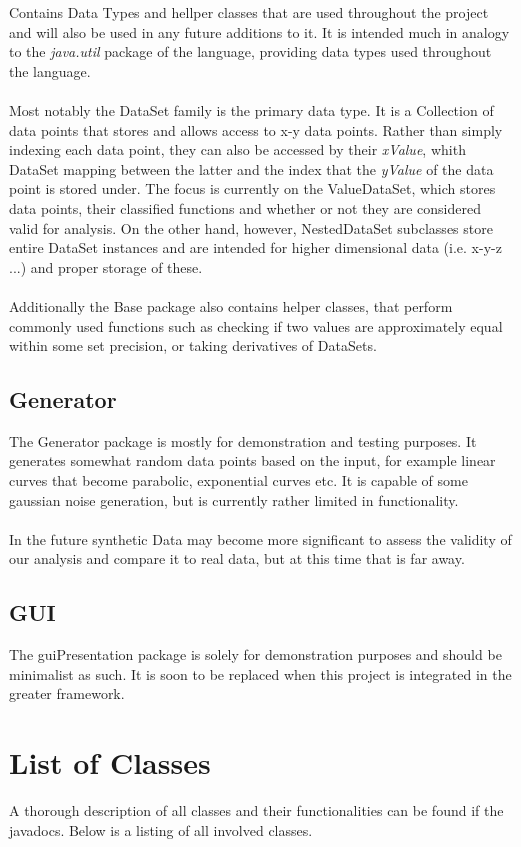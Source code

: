 \documentclass[main.tex]{subfiles}
\begin{document}
      Contains Data Types and hellper classes that are used throughout the project and will also be used in any future additions to it. It is intended much in analogy to the \emph{java.util} package of the language, providing data types used throughout the language. 
      \\\\
      Most notably the DataSet family is the primary data type. It is a Collection of data points that stores and allows access to x-y data points. Rather than simply indexing each data point, they can also be accessed by their \emph{xValue}, whith DataSet mapping between the latter and the index that the \emph{yValue} of the data point is stored under. The focus is currently on the ValueDataSet, which stores data points, their classified functions and whether or not they are considered valid for analysis. On the other hand, however, NestedDataSet subclasses store entire DataSet instances and are intended for higher dimensional data (i.e. x-y-z ...) and proper storage of these.
      \\\\
      Additionally the Base package also contains helper classes, that perform commonly used functions such as checking if two values are approximately equal within some set precision, or taking derivatives of DataSets.
      
    \subsection*{Generator}
    
      The Generator package is mostly for demonstration and testing purposes. It generates somewhat random data points based on the input, for example linear curves that become parabolic, exponential curves etc. It is capable of some gaussian noise generation, but is currently rather limited in functionality.
      \\\\
      In the future synthetic Data may become more significant to assess the validity of our analysis and compare it to real data, but at this time that is far away.
      
    \subsection*{GUI}
      
      The guiPresentation package is solely for demonstration purposes and should be minimalist as such. It is soon to be replaced when this project is integrated in the greater framework.
  
  \section*{List of Classes}
    
    A thorough description of all classes and their functionalities can be found if the javadocs. Below is a listing of all involved classes.
    
\end{document}
